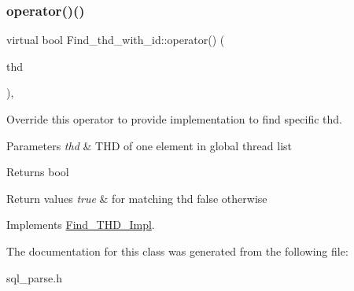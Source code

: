 \subsubsection{\texorpdfstring{operator()()}{operator()()}}
{\footnotesize\ttfamily virtual bool Find\+\_\+thd\+\_\+with\+\_\+id\+::operator() (\begin{DoxyParamCaption}\item[{T\+HD $\ast$}]{thd }\end{DoxyParamCaption})\hspace{0.3cm}{\ttfamily [inline]}, {\ttfamily [virtual]}}

Override this operator to provide implementation to find specific thd.


\begin{DoxyParams}{Parameters}
{\em thd} & T\+HD of one element in global thread list\\
\hline
\end{DoxyParams}
\begin{DoxyReturn}{Returns}
bool 
\end{DoxyReturn}

\begin{DoxyRetVals}{Return values}
{\em true} & for matching thd false otherwise \\
\hline
\end{DoxyRetVals}


Implements \mbox{\hyperlink{classFind__THD__Impl_a9241342847e36bfb0c4d8330df033b4b}{Find\+\_\+\+T\+H\+D\+\_\+\+Impl}}.



The documentation for this class was generated from the following file\+:\begin{DoxyCompactItemize}
\item 
sql\+\_\+parse.\+h\end{DoxyCompactItemize}
